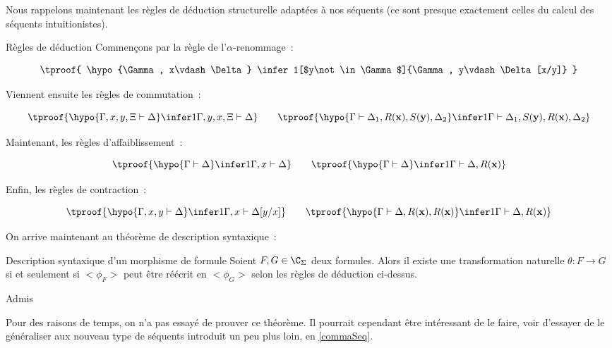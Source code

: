 Nous rappelons maintenant les règles de déduction structurelle adaptées à nos séquents
(ce sont presque exactement celles du calcul des séquents intuitionistes).

\begin{defi}{Règles de déduction}
    Commençons par la règle de l'$\alpha$-renommage~:

    \[ \tproof{ \hypo{\Gamma, x\vdash \Delta}
         \infer1[$y\not\in\Gamma$]{\Gamma, y\vdash \Delta[x/y]} }\]

    Viennent ensuite les règles de commutation~:

    \[ \tproof{ \hypo{\Gamma, x, y, \Xi\vdash \Delta}
         \infer1{\Gamma, y, x, \Xi\vdash \Delta} }
       \qquad
       \tproof{ \hypo{\Gamma\vdash \Delta_1, R(\mathbf{x}), S(\mathbf{y}), \Delta_2}
         \infer1{\Gamma\vdash \Delta_1, S(\mathbf{y}), R(\mathbf{x}), \Delta_2} }
    \]

    Maintenant, les règles d'affaiblissement~:

    \[ \tproof{ \hypo{\Gamma\vdash\Delta}
         \infer1{\Gamma, x\vdash \Delta} }
       \qquad
       \tproof{ \hypo{\Gamma\vdash\Delta}
         \infer1{\Gamma\vdash\Delta,R(\mathbf{x})} }\]

    Enfin, les règles de contraction~:

    \[ \tproof{ \hypo{\Gamma,x,y\vdash\Delta}
         \infer1{\Gamma, x\vdash\Delta[y/x]} }
       \qquad
       \tproof{ \hypo{\Gamma\vdash\Delta, R(\mathbf{x}), R(\mathbf{x})}
         \infer1{\Gamma\vdash\Delta, R(\mathbf{x})} }\]

\end{defi}

On arrive maintenant au théorème de description syntaxique~:

\begin{theo}{Description syntaxique d'un morphisme de formule}
    Soient $F,G\in\C_\Sigma$ deux formules. Alors il existe une transformation
    naturelle $\theta:F\rightarrow G$ si et seulement si $<\phi_F>$ peut être réécrit
    en $<\phi_G>$ selon les règles de déduction ci-dessus.
\end{theo}

\begin{pv}
    Admis
\end{pv}

Pour des raisons de temps, on n'a pas essayé de prouver ce théorème. Il pourrait
cependant être intéressant de le faire, voir d'essayer de le généraliser aux nouveau
type de séquents introduit un peu plus loin, en \ref{commaSeq}.


